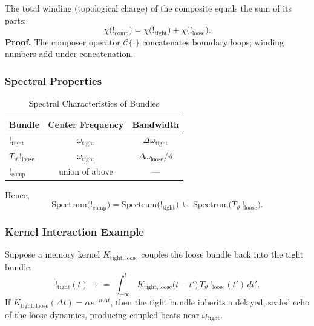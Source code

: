 The total winding (topological charge) of the composite equals the sum of its parts:
\begin{equation}
  \chi\bigl(!_{\mathrm{comp}}\bigr)
  = \chi\bigl(!_{\mathrm{tight}}\bigr)
  + \chi\bigl(!_{\mathrm{loose}}\bigr).
\end{equation}
\textbf{Proof.}  The composer operator $\mathcal{C}\{\cdot\}$ concatenates boundary loops; winding numbers add under concatenation.

\subsubsection{Spectral Properties}

\begin{table}[H]
  \centering
  \caption{Spectral Characteristics of Bundles}
  \label{tab:composite-spectra}
  \begin{tabular}{@{}lcc@{}}
    \toprule
    \textbf{Bundle}                  & \textbf{Center Frequency}   & \textbf{Bandwidth} \\
    \midrule
    $!_{\mathrm{tight}}$            & $\omega_{\mathrm{tight}}$   & $\Delta\omega_{\mathrm{tight}}$ \\
    $T_{\vartheta}\,!_{\mathrm{loose}}$ 
      & $\omega_{\mathrm{tight}}$   & $\Delta\omega_{\mathrm{loose}}/\vartheta$ \\
    \midrule
    $!_{\mathrm{comp}}$             & union of above              & — \\
    \bottomrule
  \end{tabular}
\end{table}

Hence,
\begin{equation}
  \mathrm{Spectrum}\bigl(!_{\mathrm{comp}}\bigr)
  = \mathrm{Spectrum}\bigl(!_{\mathrm{tight}}\bigr)
  \;\cup\;
  \mathrm{Spectrum}\bigl(T_{\vartheta}\,!_{\mathrm{loose}}\bigr).
\end{equation}

\subsubsection{Kernel Interaction Example}

Suppose a memory kernel $K_{\mathrm{tight,loose}}$ couples the loose bundle back into the tight bundle:
\begin{equation}
  \dot{!}_{\mathrm{tight}}(t)
  \;+\!=\;
  \int_{-\infty}^{t}
    K_{\mathrm{tight,loose}}\bigl(t-t'\bigr)\,
    T_{\vartheta}\,!_{\mathrm{loose}}(t')\,dt'.
\end{equation}
If $K_{\mathrm{tight,loose}}(\Delta t)=\alpha e^{-\alpha\Delta t}$, then the tight bundle inherits a delayed, scaled echo of the loose dynamics, producing coupled beats near $\omega_{\mathrm{tight}}$.


